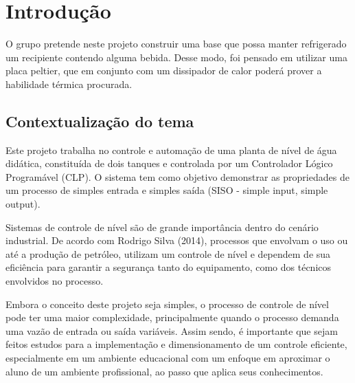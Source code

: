 \chapter{Introdução}
\label{sec:introdução}

\lettrine[lines=3]{O}{} grupo pretende neste projeto construir uma base que possa manter refrigerado um recipiente contendo alguma bebida. Desse modo, foi pensado em utilizar uma placa peltier, que em conjunto com um dissipador de calor poderá prover a habilidade térmica procurada.

\section{Contextualização do tema}
	
\hspace{11mm} Este projeto trabalha no controle e automação de uma planta de nível de água didática, constituída de dois tanques e controlada por um Controlador Lógico Programável (CLP).  O sistema tem como objetivo demonstrar as propriedades de um processo de simples entrada e simples saída (SISO - simple input, simple output).


\hspace{11mm} Sistemas de controle de nível são de grande importância dentro do cenário industrial. De acordo com Rodrigo Silva (2014), processos que envolvam o uso ou até a produção de petróleo, utilizam um controle de nível e dependem de sua eficiência para garantir a segurança tanto do equipamento, como dos técnicos envolvidos no processo.

\hspace{11mm}Embora o conceito deste projeto seja simples, o processo de controle de nível pode ter uma maior complexidade, principalmente quando o processo demanda uma vazão de entrada ou saída variáveis. Assim sendo, é importante que sejam feitos estudos para a implementação e dimensionamento de um controle eficiente, especialmente em um ambiente educacional com um enfoque em aproximar o aluno de um ambiente profissional, ao passo que aplica seus conhecimentos.


